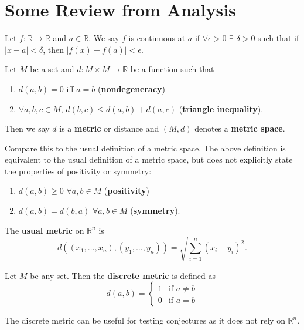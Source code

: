 \section{Some Review from Analysis} 
\begin{definition}
	Let $f : \mathbb{R} \rightarrow \mathbb{R}$ and $a \in \mathbb{R}$. We say $f$ is continuous at $a$ if $\forall \epsilon > 0$ $\exists$ $\delta > 0$ such that if $|x-a|<\delta$, then $|f(x)-f(a)|<\epsilon$. 
\end{definition}
\begin{definition}
	Let $M$ be a set and $d: M \times M \rightarrow \mathbb{R}$ be a function such that 
	\begin{enumerate}
		\item $d(a,b)=0$ iff $a=b$ (\textbf{nondegeneracy}) 
		\item $\forall a,b,c \in M$, $d(b,c) \leq d(a,b) + d(a,c)$ (\textbf{triangle inequality}). 
	\end{enumerate}
	Then we say $d$ is a \textbf{metric} or distance and $(M,d)$ denotes a \textbf{metric space}. 
\end{definition}

\noindent Compare this to the usual definition of a metric space. The above definition is equivalent to the usual definition of a metric space, but does not explicitly state the properties of positivity or symmetry: 
\begin{enumerate}
	\item $d(a,b) \geq 0$ $\forall a,b \in M$ (\textbf{positivity}) 
	\item $d(a,b) = d(b,a)$ $\forall a,b \in M$ (\textbf{symmetry}). 
\end{enumerate}
\begin{definition}
	The \textbf{usual metric} on $\mathbb{R}^{n}$ is 
	\begin{displaymath}
		d((x_1,\ldots,x_n),(y_1,\ldots,y_n)) = \sqrt{\sum_{i=1}^n (x_i-y_i)^2}. 
	\end{displaymath}
\end{definition}
\begin{definition}
	Let $M$ be any set. Then the \textbf{discrete metric} is defined as 
	\begin{displaymath}
		d(a,b) = \left\{ 
		\begin{array}{lr}
			1 & \text{if } a \neq b \\
			0 & \text{if } a = b 
		\end{array}
		\right. 
	\end{displaymath}
\end{definition}
The discrete metric can be useful for testing conjectures as it does not rely on $\mathbb{R}^n$.

